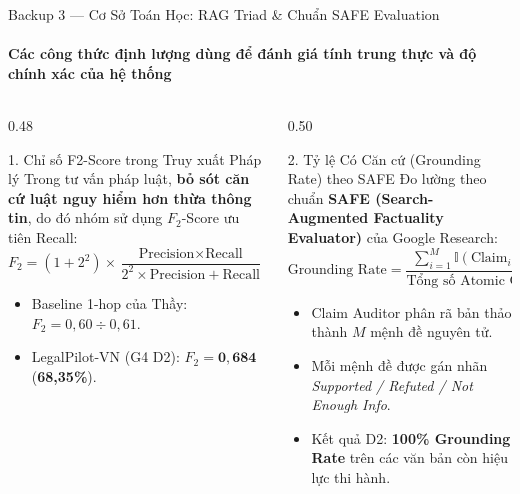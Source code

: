 \documentclass[aspectratio=169,10pt,xcolor={table}]{beamer}
\begin{document}
\begin{frame}{Backup 3 --- Cơ Sở Toán Học: RAG Triad \& Chuẩn SAFE Evaluation}
\framesubtitle{Các công thức định lượng dùng để đánh giá tính trung thực và độ chính xác của hệ thống}
\begin{columns}[T]
\begin{column}{0.48\textwidth}
\begin{block}{\small 1. Chỉ số F2-Score trong Truy xuất Pháp lý}
\footnotesize
Trong tư vấn pháp luật, \textbf{bỏ sót căn cứ luật nguy hiểm hơn thừa thông tin}, do đó nhóm sử dụng $F_2$-Score ưu tiên Recall:
$$F_2 = (1 + 2^2) \times \frac{\text{Precision} \times \text{Recall}}{2^2 \times \text{Precision} + \text{Recall}} = 5 \times \frac{P \times R}{4P + R}$$
\begin{itemize}\scriptsize
  \item Baseline 1-hop của Thầy: $F_2 = 0{,}60 \div 0{,}61$.
  \item LegalPilot-VN (G4 D2): $F_2 = \mathbf{0{,}684}$ (\textbf{68,35\%}).
\end{itemize}
\end{block}
\end{column}

\begin{column}{0.50\textwidth}
\begin{block}{\small 2. Tỷ lệ Có Căn cứ (Grounding Rate) theo SAFE}
\footnotesize
Đo lường theo chuẩn \textbf{SAFE (Search-Augmented Factuality Evaluator)} của Google Research:
$$\text{Grounding Rate} = \frac{\sum_{i=1}^{M} \mathbb{I}(\text{Claim}_i \text{ is fully supported})}{\text{Tổng số Atomic Claims sinh ra } (M)}$$
\begin{itemize}\scriptsize
  \item Claim Auditor phân rã bản thảo thành $M$ mệnh đề nguyên tử.
  \item Mỗi mệnh đề được gán nhãn \emph{Supported / Refuted / Not Enough Info}.
  \item Kết quả D2: \textbf{100\% Grounding Rate} trên các văn bản còn hiệu lực thi hành.
\end{itemize}
\end{block}
\end{column}
\end{columns}
\end{frame}
\end{document}
